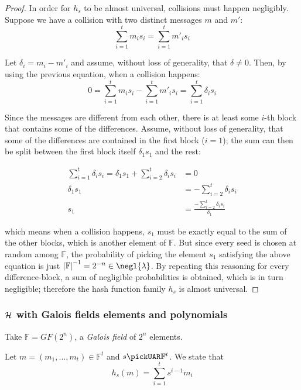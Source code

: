 \begin{proof}

    In order for $h_s$ to be almost universal, collisions must happen negligibly. Suppose we have a collision with two distinct messages $m$ and $m'$:
    \[
        \sum_{i = 1}^t m_i s_i = \sum_{i = 1}^t m'_i s_i
    \]

    Let $\delta_i = m_i - m'_i$ and assume, without loss of generality, that $\delta \neq 0$. Then, by using the previous equation, when a collision happens:
    \[
        0 = \sum_{i = 1}^t m_i s_i - \sum_{i = 1}^t m'_i s_i = \sum_{i = 1}^t \delta_i s_i
    \]

    Since the messages are different from each other, there is at least some $i$-th block that contains some of the differences. Assume, without loss of generality, that some of the differences are contained in the first block ($i = 1$); the sum can then be split between the first block itself $\delta_1 s_1$ and the rest:

    \begin{align*}
        \sum_{i = 1}^t \delta_i s_i = \delta_1 s_1 + \sum_{i = 2}^{t} \delta_i s_i &= 0 \\
        \delta_ 1 s_1 &= -\sum_{i = 2}^{t} \delta_i s_i \\
        s_1 &= \frac{-\sum_{i = 2}^{t} \delta_i s_i}{\delta_1}
    \end{align*}

    which means when a collision happens, $s_1$ must be exactly equal to the sum of the other blocks, which is another element of $\mathbb{F}$. But since every seed is chosen at random among $\mathbb{F}$, the probability of picking the element $s_1$ satisfying the above equation is just $\left|\mathbb{F}\right|^{-1} = 2^{-n} \in \negl{\lambda}$. By repeating this reasoning for every difference-block, a sum of negligible probabilities is obtained, which is in turn negligible; therefore the hash function family $h_s$ is almost universal.

\end{proof}

\subsubsection{$\mathcal{H}$ with Galois fields elements and polynomials}

\begin{construction}
    Take $ \mathbb{F}=GF(2^{n})$, a \textit{Galois field} of $2^{n}$ elements.
    
    Let $m=(m_{1}, ..., m_{t}) \in \mathbb{F}^{t} $ and $s \pickUAR \mathbb{F}^t$. We state that 
    \[
        h_{s}(m)= \sum_{i=1}^{t}s^{i-1}m_{i}
    \]
\end{construction}


